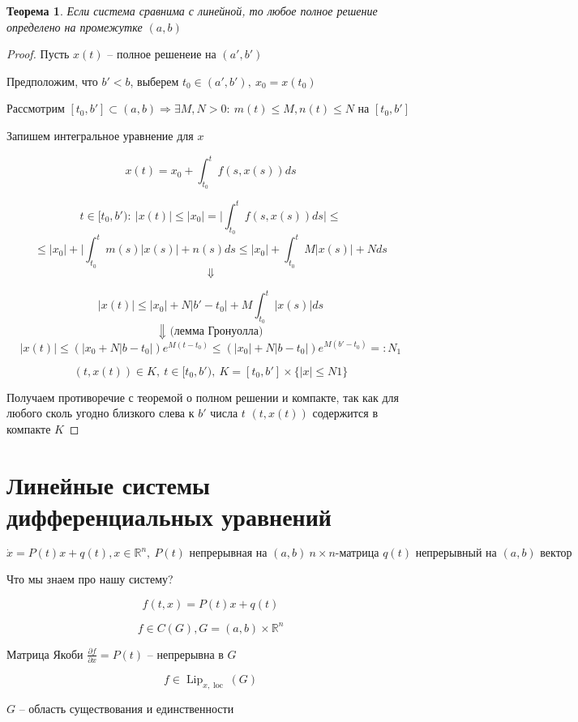 \documentclass[a4paper]{article}
\theoremstyle{indented}
\newtheorem*{theorem}{Теорема}
\theoremstyle{definition}
\theoremstyle{remark}
\DeclareMathOperator{\Lip}{Lip}
\DeclareMathOperator{\loc}{loc}
\begin{document}
\begin{theorem}
  Если система сравнима с линейной, то любое полное решение определено на промежутке $(a,b)$
\end{theorem}
\begin{proof}
  Пусть $x(t)$ -- полное решенеие на $(a',b')$

  Предположим, что $b' < b$, выберем $t_0 \in (a',b'), \ x_0 = x(t_0)$


  Рассмотрим $[t_0,b'] \subset (a,b) \Rightarrow \exists M,N > 0: \ m(t) \leqslant M, n(t) \leqslant N$ на $[t_0,b']$

  Запишем интегральное уравнение для $x$

  \[x(t) = x_0 + \int_{t_0}^{t}f(s,x(s))ds\]

  \[t \in [t_0,b'): \ |x(t)| \leqslant |x_0| = \bigg| \int_{t_0}^{t}f(s,x(s))ds \bigg| \leqslant \]
  \[\leqslant |x_0| + \bigg| \int_{t_0}^{t} m(s)|x(s)| + n(s) ds \leqslant |x_0| + \int_{t_0}^{t}M|x(s)| + N ds\]
  \[\Downarrow \]

  \[|x(t)| \leqslant |x_0| + N |b' - t_0| + M \int_{t_0}^{t}|x(s)|ds\]
  \[\Downarrow \text{ (лемма Гронуолла)}\]
  \[|x(t)| \leqslant (|x_0+ N|b - t_0|) e^{M(t-t_0)}\leqslant(|x_0|+ N|b - t_0|)e^{M(b'-t_0)} =: N_1 \]

  \[(t,x(t)) \in K, \ t \in [t_0,b'), \ K = [t_0,b'] \times \{|x| \leqslant N1\}\]

  Получаем противоречие с теоремой о полном решении и компакте, так как для любого сколь угодно близкого слева к $b'$ числа $t$ $(t,x(t))$ содержится в компакте $K$
\end{proof}

\section{Линейные системы дифференциальных уравнений}

\[\dot x = P(t)x + q(t), x \in \mathbb{R}^n, \ P(t) \text{ непрерывная на $(a,b) \ n \times n $-матрица  } q(t) \text{ непрерывный на $(a,b)$ вектор}\]
\begin{center}
  Что мы знаем про нашу систему?
\end{center}
\[f(t,x) = P(t)x + q(t)\]

\[f \in C(G), G = (a,b) \times \mathbb{R}^n\]

Матрица Якоби $\frac{\partial f}{\partial x} = P(t)$ -- непрерывна в $G$

\[f \in \Lip_{x,\loc}(G)\]

\begin{center}
  $G$ -- область существования и единственности
  
\end{center}
\end{document}
